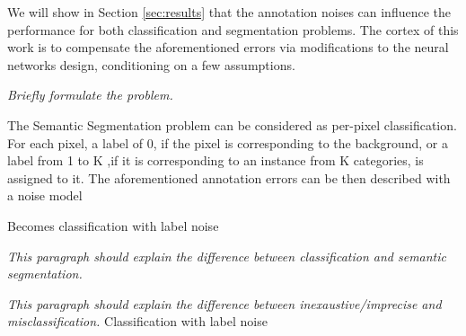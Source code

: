 We will show in Section \ref{sec:results} that the annotation noises can influence the performance for both classification and segmentation problems.
The cortex of this work is to compensate the aforementioned errors via modifications to the neural networks design, conditioning on a few assumptions.

\noindent
\textit{Briefly formulate the problem.}

\noindent
The Semantic Segmentation problem can be considered as per-pixel classification. For each pixel, a label of 0, if the pixel is corresponding to the background, or a label from 1 to K ,if it is corresponding to an instance from K categories, is assigned to it.
The aforementioned annotation errors can be then described with a noise model

Becomes classification with label noise


\textit{This paragraph should explain the difference between classification and semantic segmentation.}

\textit{This paragraph should explain the difference between inexaustive/imprecise and misclassification.}
Classification with label noise

